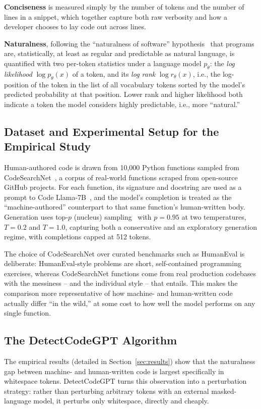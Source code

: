 \documentclass[manuscript,review]{acmart}
\begin{document}
\textbf{Conciseness} is measured simply by the number of tokens and the number of lines in a snippet, which together capture both raw verbosity and how a developer chooses to lay code out across lines.

\textbf{Naturalness}, following the ``naturalness of software'' hypothesis~\cite{hindle2016naturalness} that programs are, statistically, at least as regular and predictable as natural language, is quantified with two per-token statistics under a language model $p_\theta$: the \emph{log likelihood} $\log p_\theta(x)$ of a token, and its \emph{log rank} $\log r_\theta(x)$, i.e., the log-position of the token in the list of all vocabulary tokens sorted by the model's predicted probability at that position. Lower rank and higher likelihood both indicate a token the model considers highly predictable, i.e., more ``natural.''

\subsection{Dataset and Experimental Setup for the Empirical Study}
Human-authored code is drawn from 10{,}000 Python functions sampled from CodeSearchNet~\cite{husain2020codesearchnet}, a corpus of real-world functions scraped from open-source GitHub projects. For each function, its signature and docstring are used as a prompt to Code Llama-7B~\cite{roziere2023codellama}, and the model's completion is treated as the ``machine-authored'' counterpart to that same function's human-written body. Generation uses top-$p$ (nucleus) sampling~\cite{holtzman2019curious} with $p=0.95$ at two temperatures, $T=0.2$ and $T=1.0$, capturing both a conservative and an exploratory generation regime, with completions capped at 512 tokens.

The choice of CodeSearchNet over curated benchmarks such as HumanEval is deliberate: HumanEval-style problems are short, self-contained programming exercises, whereas CodeSearchNet functions come from real production codebases with the messiness -- and the individual style -- that entails. This makes the comparison more representative of how machine- and human-written code actually differ ``in the wild,'' at some cost to how well the model performs on any single function.

\subsection{The DetectCodeGPT Algorithm}
\label{sec:method-detect}
The empirical results (detailed in Section~\ref{sec:results}) show that the naturalness gap between machine- and human-written code is largest specifically in whitespace tokens. DetectCodeGPT turns this observation into a perturbation strategy: rather than perturbing arbitrary tokens with an external masked-language model, it perturbs only whitespace, directly and cheaply.
\end{document}
